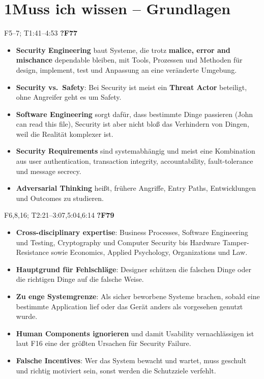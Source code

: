 \documentclass[10pt,a4paper]{article}
\newcommand{\block}[2]{\par\vspace{3pt}{\bfseries #1}\hfill{\scriptsize #2}\par\nopagebreak}
\begin{document}
\section*{1\quad Muss ich wissen -- Grundlagen}
\block{Security Engineering: Definition und Abgrenzung}{F5--7; T1:41--4:53 \quad \textbf{?F77}}
\begin{itemize}
\item \textbf{Security Engineering} baut Systeme, die trotz \textbf{malice, error and mischance} dependable bleiben, mit Tools, Prozessen und Methoden für design, implement, test und Anpassung an eine veränderte Umgebung.
\item \textbf{Security vs.\ Safety}: Bei Security ist meist ein \textbf{Threat Actor} beteiligt, ohne Angreifer geht es um Safety.
\item \textbf{Software Engineering} sorgt dafür, dass bestimmte Dinge passieren (\glqq John can read this file\grqq{}), Security ist aber nicht bloß das Verhindern von Dingen, weil die Realität komplexer ist.
\item \textbf{Security Requirements} sind systemabhängig und meist eine Kombination aus user authentication, transaction integrity, accountability, fault-tolerance und message secrecy.
\item \textbf{Adversarial Thinking} heißt, frühere Angriffe, Entry Paths, Entwicklungen und Outcomes zu studieren.
\end{itemize}
\block{Disziplinen und warum Systeme scheitern}{F6,8,16; T2:21--3:07,5:04,6:14 \quad \textbf{?F79}}
\begin{itemize}
\item \textbf{Cross-disciplinary expertise}: Business Processes, Software Engineering und Testing, Cryptography und Computer Security bis Hardware Tamper-Resistance sowie Economics, Applied Psychology, Organizations und Law.
\item \textbf{Hauptgrund für Fehlschläge}: Designer schützen die falschen Dinge oder die richtigen Dinge auf die falsche Weise.
\item \textbf{Zu enge Systemgrenze}: Als sicher beworbene Systeme brachen, sobald eine bestimmte Application lief oder das Gerät anders als vorgesehen genutzt wurde.
\item \textbf{Human Components ignorieren} und damit Usability vernachlässigen ist laut F16 eine der größten Ursachen für Security Failure.
\item \textbf{Falsche Incentives}: Wer das System bewacht und wartet, muss geschult und richtig motiviert sein, sonst werden die Schutzziele verfehlt.
\end{itemize}
\end{document}
